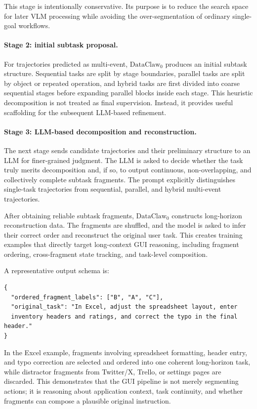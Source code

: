 \documentclass{llmxive}
\begin{document}
This stage is intentionally conservative. Its purpose is to reduce the search space for later VLM processing while avoiding the over-segmentation of ordinary single-goal workflows.

\paragraph{Stage 2: initial subtask proposal.}
For trajectories predicted as multi-event, $\text{DataClaw}_0$ produces an initial subtask structure. Sequential tasks are split by stage boundaries, parallel tasks are split by object or repeated operation, and hybrid tasks are first divided into coarse sequential stages before expanding parallel blocks inside each stage. This heuristic decomposition is not treated as final supervision. Instead, it provides useful scaffolding for the subsequent LLM-based refinement.

\paragraph{Stage 3: LLM-based decomposition and reconstruction.}
The next stage sends candidate trajectories and their preliminary structure to an LLM for finer-grained judgment. The LLM is asked to decide whether the task truly merits decomposition and, if so, to output continuous, non-overlapping, and collectively complete subtask fragments. The prompt explicitly distinguishes single-task trajectories from sequential, parallel, and hybrid multi-event trajectories.

After obtaining reliable subtask fragments, $\text{DataClaw}_0$ constructs long-horizon reconstruction data. The fragments are shuffled, and the model is asked to infer their correct order and reconstruct the original user task. This creates training examples that directly target long-context GUI reasoning, including fragment ordering, cross-fragment state tracking, and task-level composition.

A representative output schema is:
\begin{verbatim}
{
  "ordered_fragment_labels": ["B", "A", "C"],
  "original_task": "In Excel, adjust the spreadsheet layout, enter
  inventory headers and ratings, and correct the typo in the final header."
}
\end{verbatim}

In the Excel example, fragments involving spreadsheet formatting, header entry, and typo correction are selected and ordered into one coherent long-horizon task, while distractor fragments from Twitter/X, Trello, or settings pages are discarded. This demonstrates that the GUI pipeline is not merely segmenting actions; it is reasoning about application context, task continuity, and whether fragments can compose a plausible original instruction.
\end{document}

